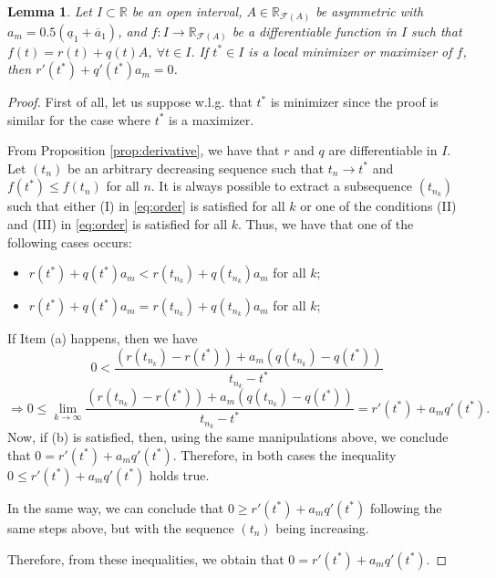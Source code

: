 \documentclass[12pt,a4paper]{article}
\newcommand{\RR}{\mathbb{R}}
\newcommand{\RFA}{\mathbb{R}_{\mathcal{F}(A)}}
\newtheorem{lemma}{Lemma}
\begin{document}
\begin{lemma}\label{lem:first_condition}
Let $I\subset \RR$ be an open interval, $A\in \RFA$ be asymmetric with $a_m = 0.5(\underline{a}_1 + \overline{a}_1)$, and $f:I \to \RFA$ be a differentiable function in $I$ such that 
$f(t) = r(t) + q(t)A$, $\forall t \in I$.
If $t^* \in I$ is a local minimizer or maximizer of $f$, then $r'(t^*) + q'(t^*)a_m = 0$. 
\end{lemma}
\begin{proof}
First of all, let us suppose w.l.g. that $t^*$ is minimizer since the proof is similar for the case where $t^*$ is a maximizer. 

From Proposition \ref{prop:derivative}, we have that $r$ and $q$ are differentiable in $I$. 
Let $(t_n)$ be an arbitrary decreasing sequence such that $t_n \to t^*$ and $f(t^*) \leq f(t_n)$ for all $n$. 
It is always possible to extract a subsequence $(t_{n_k})$ such that either (I) in \eqref{eq:order} is satisfied for all $k$ or one of the conditions (II) and (III) in \eqref{eq:order} is satisfied for all $k$. Thus, 
we have that one of the following cases occurs:
\begin{itemize}
    \item[(a)] $r(t^*) + q(t^*)a_m< r(t_{n_k}) + q(t_{n_k})a_m$ for all $k$;
    \item[(b)] $r(t^*) + q(t^*)a_m = r(t_{n_k}) + q(t_{n_k})a_m$ for all $k$;
\end{itemize}
If Item (a) happens, then we have 
\begin{equation*}
0 < \frac{(r(t_{n_k}) - r(t^*)) + a_m(q(t_{n_k}) - q(t^*)) }{t_{n_k} -t^*}      
\end{equation*}
\begin{equation*}
\Rightarrow 0 \leq \lim_{k\to \infty} \frac{(r(t_{n_k}) - r(t^*)) + a_m(q(t_{n_k}) - q(t^*)) }{t_{n_k} -t^*} = r'(t^*) + a_mq'(t^*). 
\end{equation*}
Now, if (b) is satisfied, then, using the same manipulations above, we conclude that $0= r'(t^*) + a_mq'(t^*)$. 
Therefore, in both cases the inequality $0\leq r'(t^*) + a_mq'(t^*)$ holds true. 

In the same way, we can conclude that $0\geq r'(t^*) + a_mq'(t^*)$ following the same steps above, but with the sequence $(t_n)$ being increasing. 

Therefore, from these inequalities, we obtain that $0= r'(t^*) + a_mq'(t^*)$. 
\end{proof}
\end{document}
